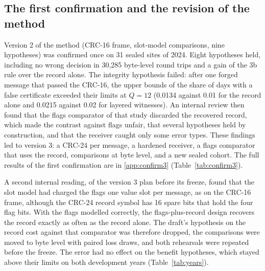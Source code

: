 \subsection{The first confirmation and the revision of the method}
\label{sec:history}
Version 2 of the method (CRC-16 frame, slot-model comparisons, nine hypotheses) was confirmed once on 31 sealed sites of 2024. Eight hypotheses held, including no wrong decision in 30,285 byte-level round trips and a gain of the 3b rule over the record alone. The integrity hypothesis failed: after one forged message that passed the CRC-16, the upper bounds of the share of days with a false certificate exceeded their limits at $Q = 12$ (0.0134 against 0.01 for the record alone and 0.0215 against 0.02 for layered witnesses). An internal review then found that the flags comparator of that study discarded the recovered record, which made the contrast against flags unfair, that several hypotheses held by construction, and that the receiver caught only some error types. These findings led to version 3: a CRC-24 per message, a hardened receiver, a flags comparator that uses the record, comparisons at byte level, and a new sealed cohort. The full results of the first confirmation are in \ref{app:confirm3} (Table~\ref{tab:confirm3}).

A second internal reading, of the version 3 plan before its freeze, found that the slot model had charged the flags one value slot per message, as on the CRC-16 frame, although the CRC-24 record symbol has 16 spare bits that hold the four flag bits. With the flags modelled correctly, the flags-plus-record design recovers the record exactly as often as the record alone. The draft's hypothesis on the record cost against that comparator was therefore dropped, the comparisons were moved to byte level with paired loss draws, and both rehearsals were repeated before the freeze. The error had no effect on the benefit hypotheses, which stayed above their limits on both development years (Table~\ref{tab:years}).

